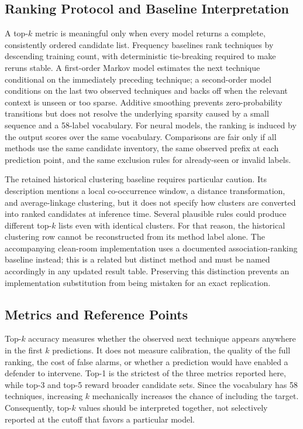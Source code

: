 \documentclass[conference]{IEEEtran}
\begin{document}
\subsection{Ranking Protocol and Baseline Interpretation}
A top-$k$ metric is meaningful only when every model returns a complete, consistently ordered candidate list. Frequency baselines rank techniques by descending training count, with deterministic tie-breaking required to make reruns stable. A first-order Markov model estimates the next technique conditional on the immediately preceding technique; a second-order model conditions on the last two observed techniques and backs off when the relevant context is unseen or too sparse. Additive smoothing prevents zero-probability transitions but does not resolve the underlying sparsity caused by a small sequence and a 58-label vocabulary. For neural models, the ranking is induced by the output scores over the same vocabulary. Comparisons are fair only if all methods use the same candidate inventory, the same observed prefix at each prediction point, and the same exclusion rules for already-seen or invalid labels.

The retained historical clustering baseline requires particular caution. Its description mentions a local co-occurrence window, a distance transformation, and average-linkage clustering, but it does not specify how clusters are converted into ranked candidates at inference time. Several plausible rules could produce different top-$k$ lists even with identical clusters. For that reason, the historical clustering row cannot be reconstructed from its method label alone. The accompanying clean-room implementation uses a documented association-ranking baseline instead; this is a related but distinct method and must be named accordingly in any updated result table. Preserving this distinction prevents an implementation substitution from being mistaken for an exact replication.

\subsection{Metrics and Reference Points}
Top-$k$ accuracy measures whether the observed next technique appears anywhere in the first $k$ predictions. It does not measure calibration, the quality of the full ranking, the cost of false alarms, or whether a prediction would have enabled a defender to intervene. Top-1 is the strictest of the three metrics reported here, while top-3 and top-5 reward broader candidate sets. Since the vocabulary has 58 techniques, increasing $k$ mechanically increases the chance of including the target. Consequently, top-$k$ values should be interpreted together, not selectively reported at the cutoff that favors a particular model.
\end{document}
